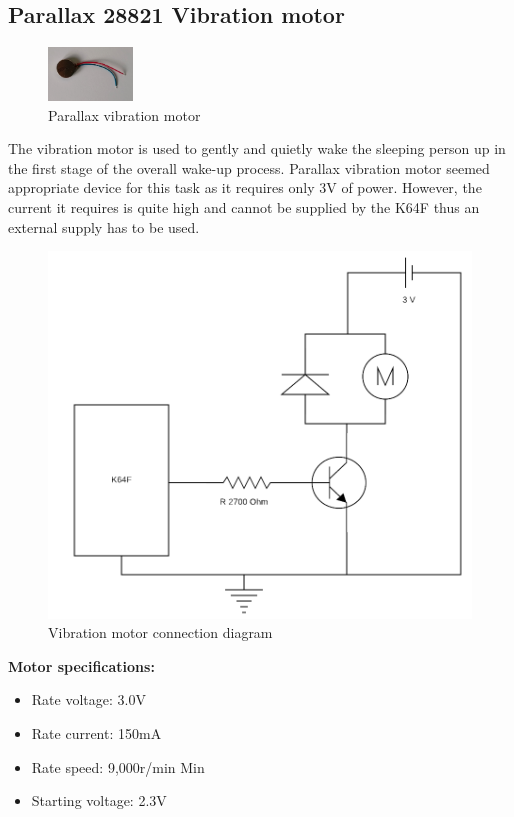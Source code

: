 \documentclass[12pt,a4paper]{article}
\begin{document}
		\subsection{Parallax 28821 Vibration motor}	
		\begin{figure}
			\centering
			\includegraphics[width=0.2\textwidth]{parallax_vib_mot1.jpg}
			\caption{Parallax vibration motor}
		\end{figure}
		
		The vibration motor is used to gently and quietly wake the sleeping person up in the first stage of the overall wake-up process. Parallax vibration motor seemed appropriate device for this task as it requires only 3V of power. However, the current it requires is quite high and cannot be supplied by the K64F thus an external supply has to be used.\\
		
		\begin{figure}[h]
			\centering
			\includegraphics[scale=0.3]{motor_diag1.png}
			\caption{Vibration motor connection diagram}
		\end{figure}

		{\bfseries Motor specifications:}
		\begin{itemize}
			\item Rate voltage: 3.0V
			\item Rate current: 150mA
			\item Rate speed: 9,000r/min Min
			\item Starting voltage: 2.3V
		\end{itemize}
\end{document}
